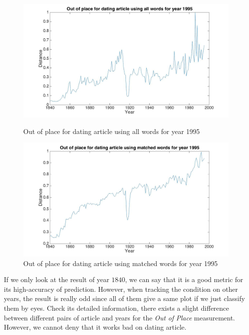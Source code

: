 \begin{figure}[H]
    \begin{minipage}[b]{0.48\linewidth}
        \includegraphics[scale=0.15]{Pictures/date_articles/outofplace/1995_all.jpg}
        \caption{Out of place for dating article using all words for year 1995}
        \label{outofplace_1995_all}
    \end{minipage}\hfill
    \begin{minipage}[b]{0.5\linewidth}
        \includegraphics[scale=0.15]{Pictures/date_articles/outofplace/1995_partial.jpg}
        \caption{Out of place for dating article using matched words for year 1995}
        \label{outofplace_1995_match}
    \end{minipage}\hfill
\end{figure}

If we only look at the result of year $1840$, we can say that it is a good metric for its high-accuracy of prediction. However, when tracking the condition on other years, the result is really odd since all of them give a same plot if we just classify them by eyes. Check its detailed information, there exists a slight difference between different pairs of article and years for the \emph{Out of Place} measurement. However, we cannot deny that it works bad on dating article.

